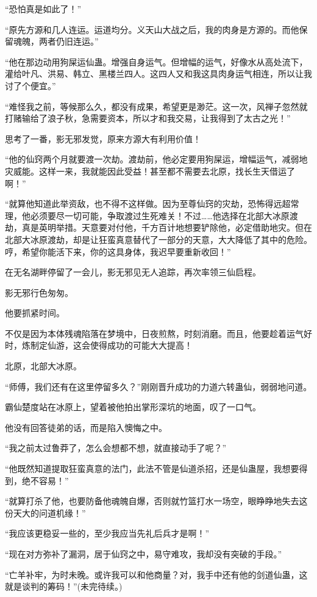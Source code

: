 \begin{this_body}
“恐怕真是如此了！”

“原先方源和几人连运。运道均分。义天山大战之后，我的肉身是方源的。而他保留魂魄，两者仍旧连运。”

“他在那边动用狗屎运仙蛊。增强自身运气。但增幅的运气，好像水从高处流下，灌给叶凡、洪易、韩立、黑楼兰四人。这四人又和我这具肉身运气相连，所以让我讨了个便宜。”

“难怪我之前，等候那么久，都没有成果，希望更是渺茫。这一次，风禅子忽然就打赌输给了浪子秋，急需要资本，所以才和我交易，让我得到了太古之光！”

思考了一番，影无邪发觉，原来方源大有利用价值！

“他的仙窍两个月就要渡一次劫。渡劫前，他必定要用狗屎运，增幅运气，减弱地灾威能。这样一来，我就能因此受益！甚至都不需要去北原，找长生天借运了啊！”

“就算他知道此举资敌，也不得不这样做。因为至尊仙窍的灾劫，恐怖得远超常理，他必须要尽一切可能，争取渡过生死难关！不过……他选择在北部大冰原渡劫，真是英明举措。天意要对付他，千方百计地想要铲除他，必定借助地灾。但在北部大冰原渡劫，却是让狂蛮真意替代了一部分的天意，大大降低了其中的危险。哼，希望你能活下来，你的这具身体，我迟早要重新收回！”

在无名湖畔停留了一会儿，影无邪见无人追踪，再次率领三仙启程。

影无邪行色匆匆。

他要抓紧时间。

不仅是因为本体残魂陷落在梦境中，日夜煎熬，时刻消磨。而且，他要趁着运气好时，炼制定仙游，这会使得成功的可能大大提高！

北原，北部大冰原。

“师傅，我们还有在这里停留多久？”刚刚晋升成功的力道六转蛊仙，弱弱地问道。

霸仙楚度站在冰原上，望着被他拍出掌形深坑的地面，叹了一口气。

他没有回答徒弟的话，而是陷入懊悔之中。

“我之前太过鲁莽了，怎么会想都不想，就直接动手了呢？”

“他既然知道提取狂蛮真意的法门，此法不管是仙道杀招，还是仙蛊屋，我想要得到，绝不容易！”

“就算打杀了他，也要防备他魂魄自爆，否则就竹篮打水一场空，眼睁睁地失去这份天大的问道机缘！”

“我应该更稳妥一些的，至少我应当先礼后兵才是啊！”

“现在对方弥补了漏洞，居于仙窍之中，易守难攻，我却没有突破的手段。”

“亡羊补牢，为时未晚。或许我可以和他商量？对，我手中还有他的剑道仙蛊，这就是谈判的筹码！”(未完待续。)

\end{this_body}

